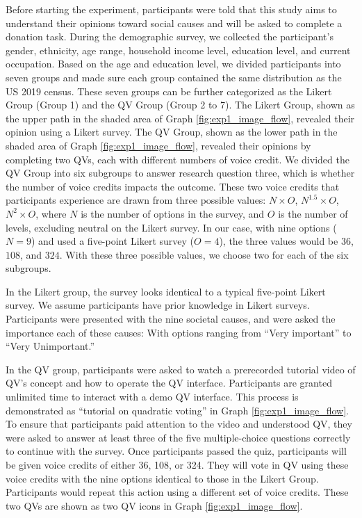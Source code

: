 Before starting the experiment,
participants were told that 
this study aims to understand their opinions 
toward social causes and will be asked to complete a donation task.
During the demographic survey, 
we collected the participant's gender, ethnicity, age range, household income level, 
education level, and current occupation.
Based on the age and education level,
we divided participants into seven groups
and made sure each group contained the same distribution
as the US 2019 census.
These seven groups can be further categorized as
the Likert Group (Group 1) and the QV Group (Group 2 to 7).
The Likert Group, shown as the upper path in the shaded area of Graph \ref{fig:exp1_image_flow}, 
revealed their opinion using a Likert survey.
The QV Group, shown as the lower path in the shaded area of Graph \ref{fig:exp1_image_flow}, 
revealed their opinions by completing two QVs, each with different numbers of voice credit.
We divided the QV Group into six subgroups
to answer research question three, 
which is whether the number of voice credits impacts the outcome.
These two voice credits that participants experience 
are drawn from three possible values: $N \times O$, $N^{1.5} \times O$, $N^2 \times O$, 
where $N$ is the number of options in the survey, 
and $O$ is the number of levels, 
excluding neutral on the Likert survey. %
In our case, with nine options ($N=9$) and
used a five-point Likert survey ($O=4$), 
the three values would be $36$, $108$, and $324$.
With these three possible values, 
we choose two for each of the six subgroups.

In the Likert group, 
the survey looks identical to a typical five-point Likert survey.
We assume participants have prior knowledge in Likert surveys.
Participants were presented with the nine societal causes, 
and were asked the importance each of these causes: 
With options ranging from ``Very important'' to ``Very Unimportant.''

In the QV group, 
participants were asked to watch 
a prerecorded tutorial video of QV's concept 
and how to operate the QV interface.
Participants are granted unlimited time 
to interact with a demo QV interface. 
This process is demonstrated as 
``tutorial on quadratic voting'' 
in Graph \ref{fig:exp1_image_flow}.
To ensure that participants paid attention to the video and understood QV, 
they were asked to answer at least three of the five multiple-choice questions 
correctly to continue with the survey.
Once participants passed the quiz, 
participants will be given voice credits of either 36, 108, or 324.
They will vote in QV using these voice credits 
with the nine options identical to those in the Likert Group.
Participants would repeat this action using a different set of voice credits.
These two QVs are shown as two QV icons in Graph \ref{fig:exp1_image_flow}.




